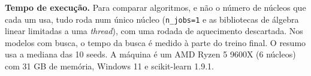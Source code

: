 \begin{table}[ht]
\centering
\caption{Grades da busca (número de combinações após os dois-pontos) e o que a busca escolheu nas 10 seeds.}
\label{tab:sv_grades}
\footnotesize

\end{table}

\textbf{Tempo de execução.} Para comparar algoritmos, e não o número de núcleos que cada um usa, tudo roda num único núcleo (\texttt{n\_jobs=1} e as bibliotecas de álgebra linear limitadas a uma \emph{thread}), com uma rodada de aquecimento descartada. Nos modelos com busca, o tempo da busca é medido à parte do treino final. O resumo usa a mediana das 10 seeds. A máquina é um AMD Ryzen 5 9600X (6 núcleos) com 31 GB de memória, Windows 11 e scikit-learn 1.9.1.
